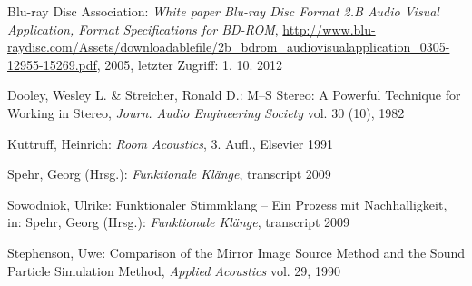 \begin{thebibliography}{}

Blu-ray Disc Association:
\emph{White paper Blu-ray Disc Format 2.B Audio Visual Application, Format Specifications for BD-ROM},
\url{http://www.blu-raydisc.com/Assets/downloadablefile/2b_bdrom_audiovisualapplication_0305-12955-15269.pdf}, 2005, letzter Zugriff: 1. 10. 2012

Dooley, Wesley L.  \& Streicher, Ronald D.:
\glqq M--S Stereo: A Powerful Technique for Working in Stereo\grqq,
\emph{Journ. Audio Engineering Society} vol. 30 (10), 1982

Kuttruff, Heinrich:
\emph{Room Acoustics}, 3. Aufl., Elsevier 1991

Spehr, Georg (Hrsg.):
\emph{Funktionale Klänge}, transcript 2009

Sowodniok, Ulrike:
\glqq Funktionaler Stimmklang -- Ein Prozess mit Nachhalligkeit\grqq,
in: Spehr, Georg (Hrsg.): \emph{Funktionale Klänge}, transcript 2009

Stephenson, Uwe:
\glqq Comparison of the Mirror Image Source Method and the Sound Particle Simulation Method\grqq,
\emph{Applied Acoustics} vol. 29, 1990


\end{thebibliography}

\clearpage\thispagestyle{empty}
\eigen  %












